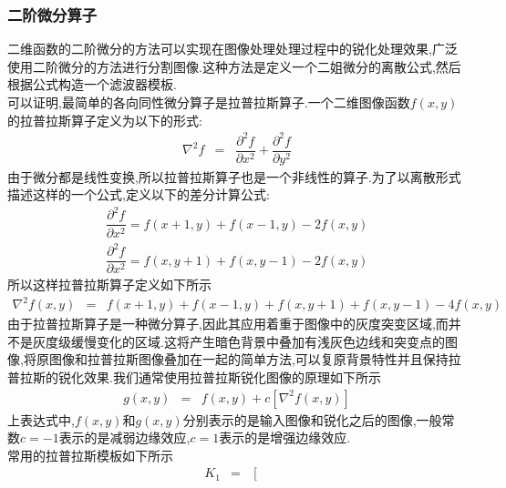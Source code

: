 \documentclass[UTF8,a4paper,10pt]{ctexart}
\begin{document}
\begin{flushleft}
        \subsubsection{二阶微分算子}
        \hspace{2em}二维函数的二阶微分的方法可以实现在图像处理处理过程中的锐化处理效果,广泛使用二阶微分的方法进行分割图像.这种方法是定义一个二姐微分的离散公式,然后根据公式构造一个滤波器模板.\\
        \hspace{2em}可以证明,最简单的各向同性微分算子是拉普拉斯算子.一个二维图像函数$f(x,y)$的拉普拉斯算子定义为以下的形式:
        \begin{eqnarray}
            \nabla^{2}f&=&\dfrac{\partial^{2}{f}}{\partial{x^{2}}}+\dfrac{\partial^{2}{f}}{\partial{y^{2}}}\nonumber
        \end{eqnarray}
        \hspace{2em}由于微分都是线性变换,所以拉普拉斯算子也是一个非线性的算子.为了以离散形式描述这样的一个公式,定义以下的差分计算公式:
        \begin{eqnarray}
            \dfrac{\partial^{2}{f}}{\partial{x^{2}}}=f(x+1,y)+f(x-1,y)-2f(x,y)\nonumber\\
            \dfrac{\partial^{2}{f}}{\partial{x^{2}}}=f(x,y+1)+f(x,y-1)-2f(x,y)\nonumber
        \end{eqnarray}
        \hspace{2em}所以这样拉普拉斯算子定义如下所示
        \begin{eqnarray}
            \nabla^{2}f(x,y)&=&f(x+1,y)+f(x-1,y)+f(x,y+1)+f(x,y-1)-4f(x,y)\nonumber
        \end{eqnarray}
        \hspace{2em}由于拉普拉斯算子是一种微分算子,因此其应用着重于图像中的灰度突变区域,而并不是灰度级缓慢变化的区域.这将产生暗色背景中叠加有浅灰色边线和突变点的图像,将原图像和拉普拉斯图像叠加在一起的简单方法,可以复原背景特性并且保持拉普拉斯的锐化效果.我们通常使用拉普拉斯锐化图像的原理如下所示
        \begin{eqnarray}
            g(x,y)&=&f(x,y)+c\left[\nabla^{2}f(x,y)\right]\nonumber
        \end{eqnarray}
        上表达式中,$f(x,y)$和$g(x,y)$分别表示的是输入图像和锐化之后的图像,一般常数$c=-1$表示的是减弱边缘效应,$c=1$表示的是增强边缘效应.\\
        \hspace{2em}常用的拉普拉斯模板如下所示
        \begin{eqnarray}
            K_{1}&=&\left[\begin{array}{ccc}

\end{array}
\end{eqnarray}
\end{flushleft}
\end{document}
